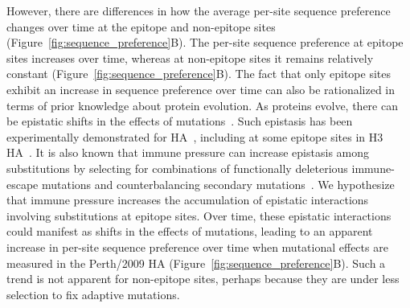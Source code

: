 \documentclass[9pt,twocolumn,twoside]{pnas-new}
\begin{document}
However, there are differences in how the average per-site sequence preference changes over time at the epitope and non-epitope sites (Figure~\ref{fig:sequence_preference}B).
The per-site sequence preference at epitope sites increases over time, whereas at non-epitope sites it remains relatively constant  (Figure~\ref{fig:sequence_preference}B).
The fact that only epitope sites exhibit an increase in sequence preference over time can also be rationalized in terms of prior knowledge about protein evolution.
As proteins evolve, there can be epistatic shifts in the effects of mutations~\cite{gong2013stability,natarajan2013epistasis,harms2014historical,starr2016epistasis,starr2017alternative,haddox2017mapping}.
Such epistasis has been experimentally demonstrated for HA~\cite{das2013defining,myers2013compensatory}, including at some epitope sites in H3 HA~\cite{wu2017diversity}.
It is also known that immune pressure can increase epistasis among substitutions by selecting for combinations of functionally deleterious immune-escape mutations and counterbalancing secondary mutations~\cite{gong2014epistatically}.
We hypothesize that immune pressure increases the accumulation of epistatic interactions involving substitutions at epitope sites.
Over time, these epistatic interactions could manifest as shifts in the effects of mutations, leading to an apparent increase in per-site sequence preference over time when mutational effects are measured in the Perth/2009 HA (Figure~\ref{fig:sequence_preference}B).
Such a trend is not apparent for non-epitope sites, perhaps because they are under less selection to fix adaptive mutations.
\end{document}
